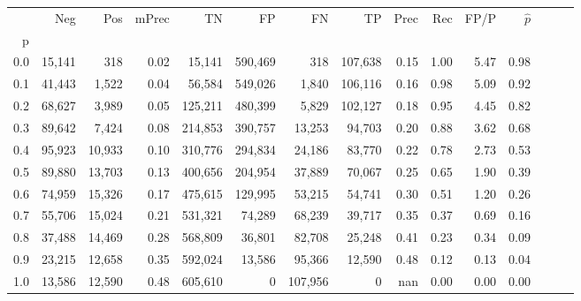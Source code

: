 \begin{tabular}{rrrrrrrrrrrrrrr}
\toprule
{} &     Neg &     Pos & mPrec &       TN &       FP &       FN &       TP &  Prec &   Rec &  FP/P & $\hat{p}$ \\
p   &         &         &       &          &          &          &          &       &       &       &           \\
\midrule
0.0 &  15,141 &     318 &  0.02 &   15,141 &  590,469 &      318 &  107,638 &  0.15 &  1.00 &  5.47 &      0.98 \\
0.1 &  41,443 &   1,522 &  0.04 &   56,584 &  549,026 &    1,840 &  106,116 &  0.16 &  0.98 &  5.09 &      0.92 \\
0.2 &  68,627 &   3,989 &  0.05 &  125,211 &  480,399 &    5,829 &  102,127 &  0.18 &  0.95 &  4.45 &      0.82 \\
0.3 &  89,642 &   7,424 &  0.08 &  214,853 &  390,757 &   13,253 &   94,703 &  0.20 &  0.88 &  3.62 &      0.68 \\
0.4 &  95,923 &  10,933 &  0.10 &  310,776 &  294,834 &   24,186 &   83,770 &  0.22 &  0.78 &  2.73 &      0.53 \\
0.5 &  89,880 &  13,703 &  0.13 &  400,656 &  204,954 &   37,889 &   70,067 &  0.25 &  0.65 &  1.90 &      0.39 \\
0.6 &  74,959 &  15,326 &  0.17 &  475,615 &  129,995 &   53,215 &   54,741 &  0.30 &  0.51 &  1.20 &      0.26 \\
0.7 &  55,706 &  15,024 &  0.21 &  531,321 &   74,289 &   68,239 &   39,717 &  0.35 &  0.37 &  0.69 &      0.16 \\
0.8 &  37,488 &  14,469 &  0.28 &  568,809 &   36,801 &   82,708 &   25,248 &  0.41 &  0.23 &  0.34 &      0.09 \\
0.9 &  23,215 &  12,658 &  0.35 &  592,024 &   13,586 &   95,366 &   12,590 &  0.48 &  0.12 &  0.13 &      0.04 \\
1.0 &  13,586 &  12,590 &  0.48 &  605,610 &        0 &  107,956 &        0 &   nan &  0.00 &  0.00 &      0.00 \\
\bottomrule
\end{tabular}
